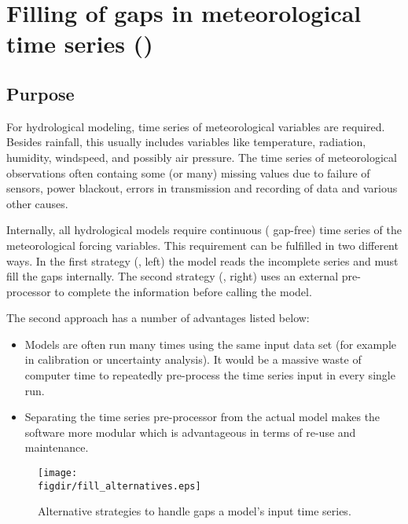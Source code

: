 
\chapter{Filling of gaps in meteorological time series ()} \label{chap:meteofill}
\renewcommand{\tabdir}{chapters/meteofill/tab}
\renewcommand{\figdir}{chapters/meteofill/fig}

\section{Purpose} \label{sec:meteofill:purpose}
For hydrological modeling, time series of meteorological variables are required. Besides rainfall, this usually includes variables like temperature, radiation, humidity, windspeed, and possibly air pressure. The time series of meteorological observations often containg some (or many) missing values due to failure of sensors, power blackout, errors in transmission and recording of data and various other causes.

Internally, all hydrological models require continuous (\ie{} gap-free) time series of the meteorological forcing variables. This requirement can be fulfilled in two different ways. In the first strategy (, left) the model reads the incomplete series and must fill the gaps internally. The second strategy (, right) uses an external pre-processor to complete the information before calling the model.

The second approach has a number of advantages listed below:

\begin{itemize}
  \item Models are often run many times using the same input data set (for example in calibration or uncertainty analysis). It would be a massive waste of computer time to repeatedly pre-process the time series input in every single run.
  \item Separating the time series pre-processor from the actual model makes the software more modular which is advantageous in terms of re-use and maintenance.
\end{itemize}

\begin{figure}
  \centering
  \texttt{[image: \\figdir/fill\_alternatives.eps]}
  \caption{Alternative strategies to handle gaps a model's input time series. \label{fig:meteofill:fill_alternatives}}
\end{figure}

